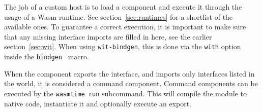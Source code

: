 The job of a custom host is to load a component and execute it through the usage of a \gls{Wasm} runtime. See section~\ref{sec:runtimes} for a shortlist of the available ones. To guarantee a correct execution, it is important to make sure that any missing interface imports are filled in here, see the earlier section~\ref{sec:wit}. When using \texttt{wit-bindgen}, this is done via the \texttt{with} option inside the \texttt{bindgen}~\cite{crates:bindgen} macro.

When the component exports the  interface, and imports only interfaces listed in the  world, it is considered a command component. Command components can be executed by the \texttt{wasmtime run} subcommand. This will compile the module to native code, instantiate it and optionally execute an export.

